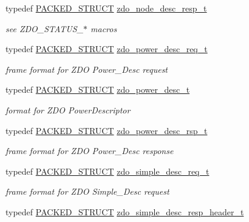 \begin{DoxyCompactItemize}
typedef \hyperlink{group___s_x_a_ga4233297bd31be5c273d4fb0758cc54d7}{P\+A\+C\+K\+E\+D\+\_\+\+S\+T\+R\+U\+CT} \hyperlink{group__zdo_ga5b77ee7a2a4f9b5f5b6145bd839c1b1f}{zdo\+\_\+node\+\_\+desc\+\_\+resp\+\_\+t}
\begin{DoxyCompactList}\small\item\em see Z\+D\+O\+\_\+\+S\+T\+A\+T\+U\+S\+\_\+$\ast$ macros \end{DoxyCompactList}\item 
typedef \hyperlink{group___s_x_a_ga4233297bd31be5c273d4fb0758cc54d7}{P\+A\+C\+K\+E\+D\+\_\+\+S\+T\+R\+U\+CT} \hyperlink{group__zdo_ga553d13ce64a2cc38a82048f624d9d1f9}{zdo\+\_\+power\+\_\+desc\+\_\+req\+\_\+t}
\begin{DoxyCompactList}\small\item\em frame format for Z\+DO Power\+\_\+\+Desc request \end{DoxyCompactList}\item 
typedef \hyperlink{group___s_x_a_ga4233297bd31be5c273d4fb0758cc54d7}{P\+A\+C\+K\+E\+D\+\_\+\+S\+T\+R\+U\+CT} \hyperlink{group__zdo_ga38f8a530fcbd8b3be41f9026c1b95b70}{zdo\+\_\+power\+\_\+desc\+\_\+t}
\begin{DoxyCompactList}\small\item\em format for Z\+DO Power\+Descriptor \end{DoxyCompactList}\item 
typedef \hyperlink{group___s_x_a_ga4233297bd31be5c273d4fb0758cc54d7}{P\+A\+C\+K\+E\+D\+\_\+\+S\+T\+R\+U\+CT} \hyperlink{group__zdo_ga52ee72ef139c275a30a02aeefd2dfb89}{zdo\+\_\+power\+\_\+desc\+\_\+rsp\+\_\+t}
\begin{DoxyCompactList}\small\item\em frame format for Z\+DO Power\+\_\+\+Desc response \end{DoxyCompactList}\item 
typedef \hyperlink{group___s_x_a_ga4233297bd31be5c273d4fb0758cc54d7}{P\+A\+C\+K\+E\+D\+\_\+\+S\+T\+R\+U\+CT} \hyperlink{group__zdo_gaa612a19982dc0c39d207a0662e8a0761}{zdo\+\_\+simple\+\_\+desc\+\_\+req\+\_\+t}
\begin{DoxyCompactList}\small\item\em frame format for Z\+DO Simple\+\_\+\+Desc request \end{DoxyCompactList}\item 
typedef \hyperlink{group___s_x_a_ga4233297bd31be5c273d4fb0758cc54d7}{P\+A\+C\+K\+E\+D\+\_\+\+S\+T\+R\+U\+CT} \hyperlink{group__zdo_gaee853401cb00e58396b01015a1713f3b}{zdo\+\_\+simple\+\_\+desc\+\_\+resp\+\_\+header\+\_\+t}

\end{DoxyCompactItemize}
